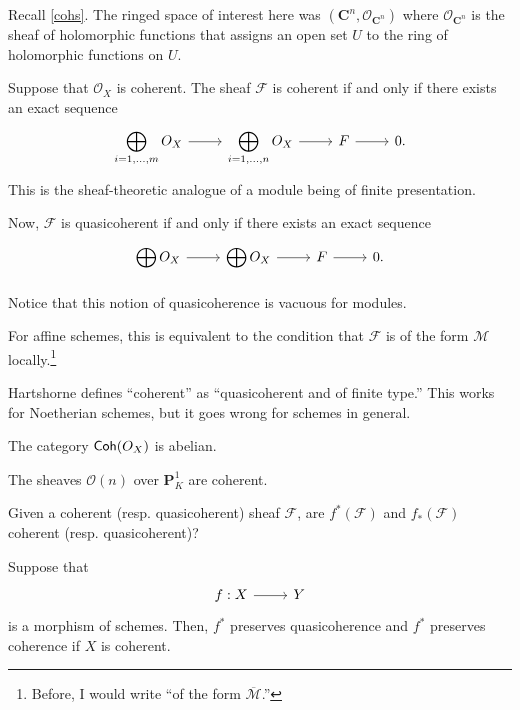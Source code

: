 \documentclass [11 pt, oneside] {article}
\begin{document}
Recall \cref{cohs}. The ringed space of interest here was $(\mathbf{C}^n, \mathscr{O}_{\mathbf{C}^n})$ where $\mathscr{O}_{\mathbf{C}^n}$ is the sheaf of holomorphic functions that assigns an open set $U$ to the ring of holomorphic functions on $U$.

Suppose that $\mathscr{O}_X$ is coherent. The sheaf $\mathscr{F}$ is coherent if and only if there exists an exact sequence
\[
\begin{tikzcd}
	\displaystyle\bigoplus_{i=1,\hdots,m} \mathscr{O}_X\ar[r]& \displaystyle\bigoplus_{i=1,\hdots,n} \mathscr{O}_X \ar[r]&\mathscr{F}\ar[r]&0.
\end{tikzcd}
\]
This is the sheaf-theoretic analogue of a module being of finite presentation.

Now, $\mathscr{F}$ is quasicoherent if and only if there exists an exact sequence
\[
\begin{tikzcd}
	\displaystyle \bigoplus_{}\mathscr{O}_X \ar[r] & \displaystyle \bigoplus_{}\mathscr{O}_X\ar[r]&\mathscr{F}\ar[r]&0.
\end{tikzcd}
\]
Notice that this notion of quasicoherence is vacuous for modules.

For affine schemes, this is equivalent to the condition that $\mathscr{F}$ is of the form $\mathscr{M}$ locally.\footnote{Before, I would write ``of the form $\overline{\mathscr{M}}$.''}

\begin{remark}
	Hartshorne defines ``coherent'' as ``quasicoherent and of finite type.'' This works for Noetherian schemes, but it goes wrong for schemes in general.
\end{remark}

The category $\textsf{Coh}(\relax{O}_X)$ is abelian.

\begin{example}[ ]\label{}\text{}
The sheaves $\mathscr{O}(n)$ over $\mathbf{P}^1_K$ are coherent.
\end{example}

\begin{problem}
	Given a coherent (resp. quasicoherent) sheaf $\mathscr{F}$, are $f^*(\mathscr{F})$ and $f_*(\mathscr{F})$ coherent (resp. quasicoherent)?
\end{problem}

Suppose that
\[
\begin{tikzcd}
f:X\ar[r]&Y
\end{tikzcd}
\]
is a morphism of schemes. Then, $f^*$ preserves quasicoherence and $f^*$ preserves coherence if $X$ is coherent.
\end{document}
